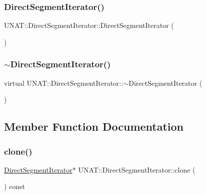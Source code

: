 \subsubsection{\texorpdfstring{DirectSegmentIterator()}{DirectSegmentIterator()}\hspace{0.1cm}{\footnotesize\ttfamily [4/4]}}
{\footnotesize\ttfamily U\+N\+A\+T\+::\+Direct\+Segment\+Iterator\+::\+Direct\+Segment\+Iterator (\begin{DoxyParamCaption}\item[{const \mbox{\hyperlink{classUNAT_1_1DirectSegmentIterator}{Direct\+Segment\+Iterator}} \&}]{ }\end{DoxyParamCaption})}

\mbox{\label{classUNAT_1_1DirectSegmentIterator_adb1d85d45bb743fbc6585531784ba769}} 
\subsubsection{\texorpdfstring{$\sim$DirectSegmentIterator()}{~DirectSegmentIterator()}\hspace{0.1cm}{\footnotesize\ttfamily [2/2]}}
{\footnotesize\ttfamily virtual U\+N\+A\+T\+::\+Direct\+Segment\+Iterator\+::$\sim$\+Direct\+Segment\+Iterator (\begin{DoxyParamCaption}{ }\end{DoxyParamCaption})\hspace{0.3cm}{\ttfamily [virtual]}}



\subsection{Member Function Documentation}
\mbox{\label{classUNAT_1_1DirectSegmentIterator_a998b5eef5895e387e54811ef3f5ffd84}} 
\subsubsection{\texorpdfstring{clone()}{clone()}\hspace{0.1cm}{\footnotesize\ttfamily [1/2]}}
{\footnotesize\ttfamily \mbox{\hyperlink{classUNAT_1_1DirectSegmentIterator}{Direct\+Segment\+Iterator}}$\ast$ U\+N\+A\+T\+::\+Direct\+Segment\+Iterator\+::clone (\begin{DoxyParamCaption}{ }\end{DoxyParamCaption}) const\hspace{0.3cm}{\ttfamily [inline]}}

